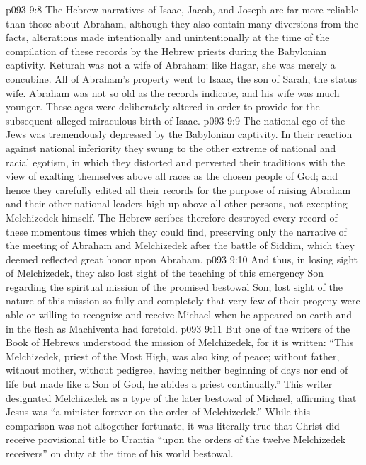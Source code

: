 \vs p093 9:8 The Hebrew narratives of Isaac, Jacob, and Joseph are far more reliable than those about Abraham, although they also contain many diversions from the facts, alterations made intentionally and unintentionally at the time of the compilation of these records by the Hebrew priests during the Babylonian captivity. Keturah was not a wife of Abraham; like Hagar, she was merely a concubine. All of Abraham’s property went to Isaac, the son of Sarah, the status wife. Abraham was not so old as the records indicate, and his wife was much younger. These ages were deliberately altered in order to provide for the subsequent alleged miraculous birth of Isaac.
\pc \vs p093 9:9 The national ego of the Jews was tremendously depressed by the Babylonian captivity. In their reaction against national inferiority they swung to the other extreme of national and racial egotism, in which they distorted and perverted their traditions with the view of exalting themselves above all races as the chosen people of God; and hence they carefully edited all their records for the purpose of raising Abraham and their other national leaders high up above all other persons, not excepting Melchizedek himself. The Hebrew scribes therefore destroyed every record of these momentous times which they could find, preserving only the narrative of the meeting of Abraham and Melchizedek after the battle of Siddim, which they deemed reflected great honor upon Abraham.
\vs p093 9:10 And thus, in losing sight of Melchizedek, they also lost sight of the teaching of this emergency Son regarding the spiritual mission of the promised bestowal Son; lost sight of the nature of this mission so fully and completely that very few of their progeny were able or willing to recognize and receive Michael when he appeared on earth and in the flesh as Machiventa had foretold.
\vs p093 9:11 But one of the writers of the Book of Hebrews understood the mission of Melchizedek, for it is written: “This Melchizedek, priest of the Most High, was also king of peace; without father, without mother, without pedigree, having neither beginning of days nor end of life but made like a Son of God, he abides a priest continually.” This writer designated Melchizedek as a type of the later bestowal of Michael, affirming that Jesus was “a minister forever on the order of Melchizedek.” While this comparison was not altogether fortunate, it was literally true that Christ did receive provisional title to Urantia “upon the orders of the twelve Melchizedek receivers” on duty at the time of his world bestowal.
